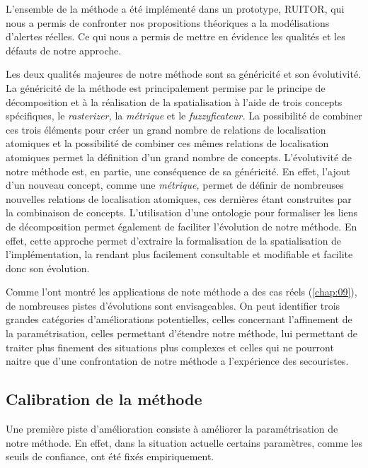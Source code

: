 L'ensemble de la méthode a été implémenté dans un prototype, RUITOR,
qui nous a permis de confronter nos propositions théoriques a la
modélisations d'alertes réelles. Ce qui nous a permis de mettre en
évidence les qualités et les défauts de notre approche.

Les deux qualités majeures de notre méthode sont sa généricité et son
évolutivité. La généricité de la méthode est principalement permise
par le principe de décomposition et à la réalisation de la
spatialisation à l'aide de trois concepts spécifiques, le
\emph{rasterizer,} la \emph{métrique} et le \emph{fuzzyficateur.} La
possibilité de combiner ces trois éléments pour créer un grand nombre
de relations de localisation atomiques et la possibilité de combiner
ces mêmes relations de localisation atomiques permet la définition
d'un grand nombre de concepts. L'évolutivité de notre méthode est, en
partie, une conséquence de sa généricité. En effet, l'ajout d'un
nouveau concept, comme une \emph{métrique,} permet de définir de
nombreuses nouvelles relations de localisation atomiques, ces
dernières étant construites par la combinaison de
concepts. L'utilisation d'une  ontologie pour formaliser les liens de
décomposition permet également de faciliter l'évolution de notre
méthode. En effet, cette approche permet d'extraire la formalisation
de la spatialisation de l'implémentation, la rendant plus facilement
consultable et modifiable et facilite donc son évolution.


Comme l'ont montré les applications de note méthode a des cas réels
(\autoref{chap:09}), de nombreuses pistes d'évolutions sont
envisageables. On peut identifier trois grandes catégories
d'améliorations potentielles, celles concernant l'affinement de la
paramétrisation, celles permettant d'étendre notre méthode, lui
permettant de traiter plus finement des situations plus complexes et
celles qui ne pourront naitre que d'une confrontation de notre méthode
a l'expérience des secouristes.

\subsection*{Calibration de la méthode}

Une première piste d'amélioration consiste à améliorer la
paramétrisation de notre méthode. En effet, dans la situation actuelle
certains paramètres, comme les seuils de confiance, ont été fixés
empiriquement.

